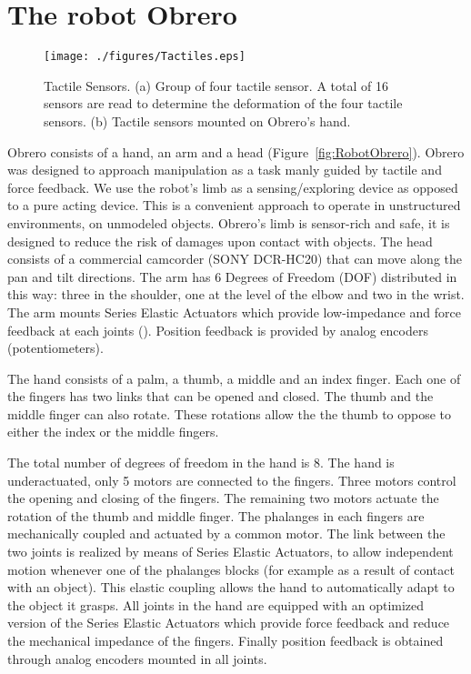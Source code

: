 
\section{The robot Obrero}
\label{sec:platform}


\begin{figure}[tbp]
\centerline{
\texttt{[image: ./figures/Tactiles.eps]}
} \caption{Tactile Sensors. (a) Group of four tactile sensor. A
total of 16 sensors are read to determine the deformation of the
four tactile sensors. (b) Tactile sensors mounted on Obrero's
hand.} \label{fig:TactileSensors}
\end{figure}

Obrero \cite{obrero} consists of a hand, an arm and a head
(Figure~\ref{fig:RobotObrero}). Obrero was designed to approach
manipulation as a task manly guided by tactile and force feedback.
We use the robot's limb as a sensing/exploring device as opposed
to a pure acting device. This is a convenient approach to operate
in unstructured environments, on unmodeled objects. Obrero's limb
is sensor-rich and safe, it is designed to reduce the risk of
damages upon contact with objects. The head consists of a
commercial camcorder (SONY DCR-HC20) that can move along the pan
and tilt directions. The arm has 6 Degrees of Freedom (DOF)
distributed in this way: three in the shoulder, one at the level of the
elbow and two in the wrist. The arm mounts Series Elastic Actuators
\cite{williamson95series} which provide low-impedance and force
feedback at each joints (\cite{AaronArm}). Position feedback is
provided by analog encoders (potentiometers).

The hand consists of a palm, a thumb, a middle and an
index finger. Each one of the fingers has two links that can be
opened and closed. The thumb and the middle finger can also
rotate. These rotations allow the the thumb to oppose to either
the index or the middle fingers.


The total number of degrees of freedom in the hand is 8. The hand
is underactuated, only 5 motors are connected to the fingers.
Three motors control the opening and closing of the fingers. The
remaining two motors actuate the rotation of the thumb and middle
finger. The phalanges in each fingers are mechanically coupled and
actuated by a common motor. The link between the two joints is
realized by means of Series Elastic Actuators, to allow
independent motion whenever one of the phalanges blocks (for
example as a result of contact with an object). This elastic
coupling allows the hand to automatically adapt to the object it
grasps. All joints in the hand are equipped with an optimized
version of the Series Elastic Actuators \cite{actuator} which
provide force feedback and reduce the mechanical impedance of the
fingers. Finally position feedback is obtained through analog
encoders mounted in all joints.

